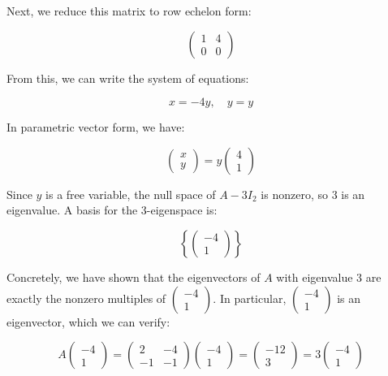 \documentclass[a4paper,12pt]{article}
\begin{document}
\begin{frame}
Next, we reduce this matrix to row echelon form:

\[
\begin{pmatrix}
1 & 4 \\
0 & 0
\end{pmatrix}
\]

From this, we can write the system of equations:

\[
x = -4y, \quad y = y
\]

In parametric vector form, we have:

\[
\begin{pmatrix}
x \\
y
\end{pmatrix} = y \begin{pmatrix} 4 \\ 1 \end{pmatrix}
\]

Since \( y \) is a free variable, the null space of \( A - 3I_2 \) is nonzero, so \( 3 \) is an eigenvalue. A basis for the \( 3 \)-eigenspace is:

\[
\left\{ \begin{pmatrix} -4 \\ 1 \end{pmatrix} \right\}
\]

Concretely, we have shown that the eigenvectors of \( A \) with eigenvalue \( 3 \) are exactly the nonzero multiples of \( \begin{pmatrix} -4 \\ 1 \end{pmatrix} \). In particular, \( \begin{pmatrix} -4 \\ 1 \end{pmatrix} \) is an eigenvector, which we can verify:

\[
A \begin{pmatrix} -4 \\ 1 \end{pmatrix} = \begin{pmatrix} 2 & -4 \\ -1 & -1 \end{pmatrix} \begin{pmatrix} -4 \\ 1 \end{pmatrix} = \begin{pmatrix} -12 \\ 3 \end{pmatrix} = 3 \begin{pmatrix} -4 \\ 1 \end{pmatrix}
\]


\end{frame}
\end{document}
